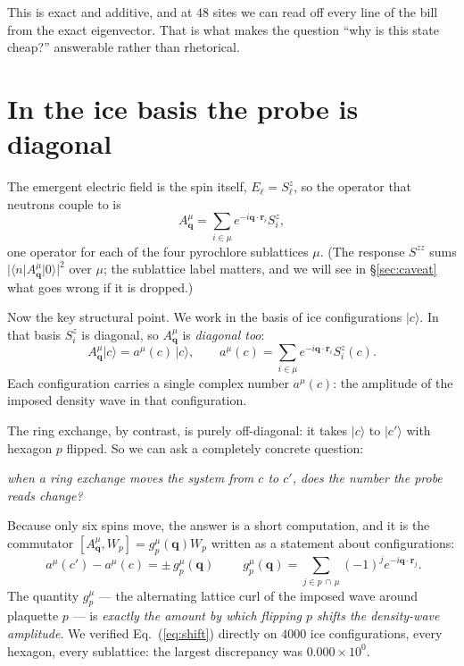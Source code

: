 \documentclass[11pt]{article}
\newcommand{\bq}{\bm q}
\newcommand{\Wp}{W_p}
\begin{document}
\noindent
This is exact and additive, and at $48$ sites we can read off every line
of the bill from the exact eigenvector. That is what makes the question
``why is this state cheap?'' answerable rather than rhetorical.

\section{In the ice basis the probe is diagonal}

The emergent electric field is the spin itself, $E_\ell=S^z_\ell$, so
the operator that neutrons couple to is
\begin{equation}
A^\mu_{\bq}=\sum_{i\in\mu}e^{-i\bq\cdot\bm r_i}S^z_i ,
\label{eq:probe}
\end{equation}
one operator for each of the four pyrochlore sublattices $\mu$. (The
response $S^{zz}$ sums $|\langle n|A^\mu_{\bq}|0\rangle|^2$ over $\mu$;
the sublattice label matters, and we will see in
\S\ref{sec:caveat} what goes wrong if it is dropped.)

Now the key structural point. We work in the basis of ice
configurations $|c\rangle$. In that basis $S^z_i$ is diagonal, so
$A^\mu_{\bq}$ is \emph{diagonal too}:
\begin{equation}
A^\mu_{\bq}|c\rangle=a^\mu(c)\,|c\rangle,
\qquad
a^\mu(c)=\sum_{i\in\mu}e^{-i\bq\cdot\bm r_i}S^z_i(c).
\label{eq:diag}
\end{equation}
Each configuration carries a single complex number $a^\mu(c)$: the
amplitude of the imposed density wave in that configuration.

The ring exchange, by contrast, is purely off-diagonal: it takes
$|c\rangle$ to $|c'\rangle$ with hexagon $p$ flipped. So we can ask a
completely concrete question:

\begin{center}
\emph{when a ring exchange moves the system from $c$ to $c'$, does the
number the probe reads change?}
\end{center}

Because only six spins move, the answer is a short computation, and it
is the commutator $[A^\mu_{\bq},\Wp]=g^\mu_p(\bq)\Wp$ written as a
statement about configurations:
\begin{equation}
\boxed{\;a^\mu(c')-a^\mu(c)=\pm\,g^\mu_p(\bq)\;}
\qquad
g^\mu_p(\bq)=\!\!\sum_{j\in p\,\cap\,\mu}\!\!(-1)^{j}
e^{-i\bq\cdot\bm r_j}.
\label{eq:shift}
\end{equation}
The quantity $g^\mu_p$ --- the alternating lattice curl of the imposed
wave around plaquette $p$ --- is \emph{exactly the amount by which
flipping $p$ shifts the density-wave amplitude}. We verified
Eq.~(\ref{eq:shift}) directly on $4000$ ice configurations, every
hexagon, every sublattice: the largest discrepancy was
$0.000\times10^{0}$.
\end{document}
